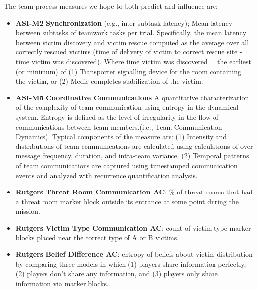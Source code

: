 \noindent The team process measures we hope to both predict and influence are:

\begin{itemize}

    \item \textbf{ASI-M2 Synchronization} (e.g., inter-subtask latency);
        Mean latency between subtasks of teamwork tasks per
        trial. Specifically, the mean latency between victim discovery and
        victim rescue computed as the average over all correctly rescued
        victims (time of delivery of victim to correct rescue site - time
        victim was discovered). Where time victim was discovered = the earliest
        (or minimum) of (1) Transporter signalling device for the room
        containing the victim, or (2) Medic completes stabilization of the
        victim.
 
    \item \textbf{ASI-M5 Coordinative Communications} A quantitative
        characterization of the complexity of team communication using entropy
        in the dynamical system. Entropy is defined as the level of
        irregularity in the flow of communications between team members.(i.e.,
        Team Communication Dynamics).  Typical components of the measure are:
        (1) Intensity and distributions of team communications are calculated
        using calculations of over message frequency, duration, and intra-team
        variance. (2) Temporal patterns of team communications are captured
        using timestamped communication events and analyzed with recurrence
        quantification analysis.

    \item \textbf{Rutgers Threat Room Communication AC}: \% of threat
        rooms that had a threat room marker block outside its entrance at some
        point during the mission.  

    \item \textbf{Rutgers Victim Type Communication AC}: count of
        victim type marker blocks placed near the correct type of A or B
        victims.
    
    \item \textbf{Rutgers Belief Difference AC}: entropy of beliefs about
        victim distribution by comparing three models in which (1) players
        share information perfectly, (2) players don't share any information,
        and (3) players only share information via marker blocks.  

\end{itemize}

